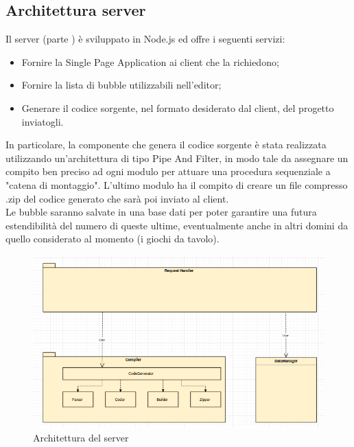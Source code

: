 \documentclass[../PianoDiQualifica.tex]{subfiles}
\begin{document}
		\subsection{Architettura server}
			Il server (parte ) è sviluppato in Node.js ed offre i seguenti servizi:
			\begin{itemize}
				\item Fornire la Single Page Application ai client che la richiedono;
				\item Fornire la lista di bubble utilizzabili nell'editor;
				\item Generare il codice sorgente, nel formato desiderato dal client, del progetto
				inviatogli.
			\end{itemize}
			In particolare, la componente che genera il codice sorgente è stata realizzata utilizzando
			un'architettura di tipo Pipe And Filter, in modo tale da assegnare un compito ben preciso
			ad ogni modulo per attuare una procedura sequenziale a "catena di montaggio". L'ultimo
			modulo ha il compito di creare un file compresso .zip del codice generato che sarà poi
			inviato al client.\\
			Le bubble saranno salvate in una base dati per poter garantire una futura estendibilità del
			numero di queste ultime, eventualmente anche in altri domini da quello considerato al
			momento (i giochi da tavolo).
			\begin{figure}[H]\label{fig:ServerSubsystem}
				\centering
				\includegraphics[scale=0.4]{Immagini/DiagrammaArchitettura/ServerSubsystem.png}
				\caption{Architettura del server}
			\end{figure}
\end{document}
